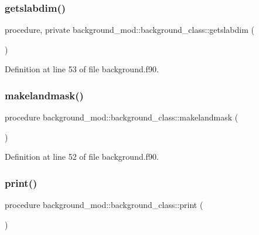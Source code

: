 \subsubsection{\texorpdfstring{getslabdim()}{getslabdim()}}
{\footnotesize\ttfamily procedure, private background\+\_\+mod\+::background\+\_\+class\+::getslabdim (\begin{DoxyParamCaption}{ }\end{DoxyParamCaption})\hspace{0.3cm}{\ttfamily [private]}}



Definition at line 53 of file background.\+f90.

\mbox{\label{structbackground__mod_1_1background__class_a1995f020f28b9800b39a265dfce1f868}} 
\subsubsection{\texorpdfstring{makelandmask()}{makelandmask()}}
{\footnotesize\ttfamily procedure background\+\_\+mod\+::background\+\_\+class\+::makelandmask (\begin{DoxyParamCaption}{ }\end{DoxyParamCaption})\hspace{0.3cm}{\ttfamily [private]}}



Definition at line 52 of file background.\+f90.

\mbox{\label{structbackground__mod_1_1background__class_aa1c611fb6813d423cba8f53bdf25465d}} 
\subsubsection{\texorpdfstring{print()}{print()}}
{\footnotesize\ttfamily procedure background\+\_\+mod\+::background\+\_\+class\+::print (\begin{DoxyParamCaption}{ }\end{DoxyParamCaption})\hspace{0.3cm}{\ttfamily [private]}}



